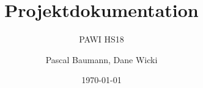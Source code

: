 \documentclass[a4paper]{scrreprt}
\title{Projektdokumentation}
\subtitle{PAWI HS18}
\author{Pascal Baumann, Dane Wicki}
\date{\today}
\begin{document}
\begin{titlepage}
\maketitle
\end{titlepage}


\appendix
\end{document}
